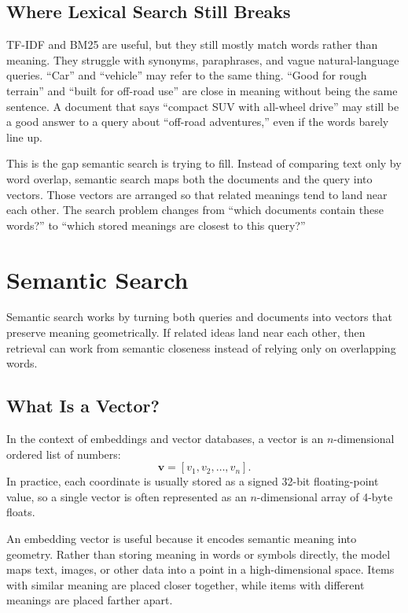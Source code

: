 \documentclass[12pt]{article}
\begin{document}
\subsection{Where Lexical Search Still Breaks}

TF-IDF and BM25 are useful, but they still mostly match words rather than
meaning. They struggle with synonyms, paraphrases, and vague
natural-language queries. ``Car'' and ``vehicle'' may refer to the same
thing. ``Good for rough terrain'' and ``built for off-road use'' are close
in meaning without being the same sentence. A document that says
``compact SUV with all-wheel drive'' may still be a good answer to a query
about ``off-road adventures,'' even if the words barely line up.

This is the gap semantic search is trying to fill. Instead of comparing
text only by word overlap, semantic search maps both the documents and the
query into vectors. Those vectors are arranged so that related meanings
tend to land near each other. The search problem changes from ``which
documents contain these words?'' to ``which stored meanings are closest
to this query?''

\section{Semantic Search}

Semantic search works by turning both queries and documents into vectors
that preserve meaning geometrically. If related ideas land near each
other, then retrieval can work from semantic closeness instead of relying
only on overlapping words.

\subsection{What Is a Vector?}

In the context of embeddings and vector databases, a vector is an
$n$-dimensional ordered list of numbers:
\[
\mathbf{v} = [v_1, v_2, \dots, v_n].
\]
In practice, each coordinate is usually stored as a signed 32-bit
floating-point value, so a single vector is often represented as an
$n$-dimensional array of 4-byte floats.

An embedding vector is useful because it encodes semantic meaning into
geometry. Rather than storing meaning in words or symbols directly, the
model maps text, images, or other data into a point in a high-dimensional
space. Items with similar meaning are placed closer together, while items
with different meanings are placed farther apart.
\end{document}
